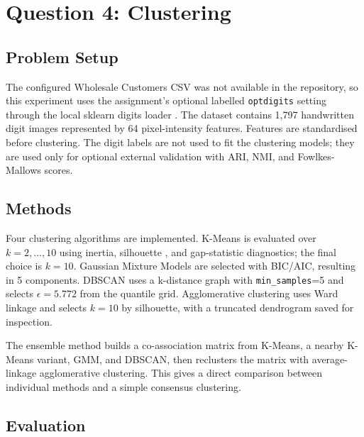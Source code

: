 \section{Question 4: Clustering}

\subsection{Problem Setup}

The configured Wholesale Customers CSV was not available in the repository, so this experiment uses the assignment's optional labelled \texttt{optdigits} setting through the local sklearn digits loader \cite{uciOpticalDigits}. The dataset contains 1{,}797 handwritten digit images represented by 64 pixel-intensity features. Features are standardised before clustering. The digit labels are not used to fit the clustering models; they are used only for optional external validation with ARI, NMI, and Fowlkes-Mallows scores.

\subsection{Methods}

Four clustering algorithms are implemented. K-Means is evaluated over $k=2,\ldots,10$ using inertia, silhouette \cite{rousseeuw1987silhouettes}, and gap-statistic diagnostics; the final choice is $k=10$. Gaussian Mixture Models are selected with BIC/AIC, resulting in 5 components. DBSCAN \cite{ester1996dbscan} uses a k-distance graph with \texttt{min\_samples}=5 and selects $\epsilon=5.772$ from the quantile grid. Agglomerative clustering uses Ward linkage and selects $k=10$ by silhouette, with a truncated dendrogram saved for inspection.

The ensemble method builds a co-association matrix from K-Means, a nearby K-Means variant, GMM, and DBSCAN, then reclusters the matrix with average-linkage agglomerative clustering. This gives a direct comparison between individual methods and a simple consensus clustering.

\subsection{Evaluation}

